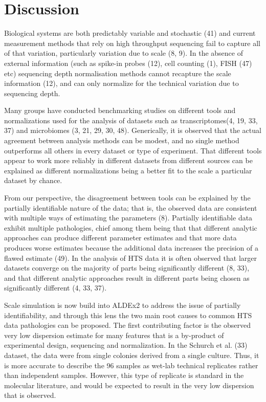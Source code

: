 \documentclass[
]{article}
\begin{document}
\section{Discussion}\label{discussion}

\doublespacing
\singlespacing

Biological systems are both predictably variable and stochastic (41) and
current measurement methods that rely on high throughput sequencing fail
to capture all of that variation, particularly variation due to scale
(8, 9). In the absence of external information (such as spike-in probes
(12), cell counting (1), FISH (47) etc) sequencing depth normalisation
methods cannot recapture the scale information (12), and can only
normalize for the technical variation due to sequencing depth.

Many groups have conducted benchmarking studies on different tools and
normalizations used for the analysis of datasets such as
transcriptomes(4, 19, 33, 37) and microbiomes (3, 21, 29, 30, 48).
Generically, it is observed that the actual agreement between analysis
methods can be modest, and no single method outperforms all others in
every dataset or type of experiment. That different tools appear to work
more reliably in different datasets from different sources can be
explained as different normalizations being a better fit to the scale a
particular dataset by chance.

From our perspective, the disagreement between tools can be explained by
the partially identifiable nature of the data; that is, the observed
data are consistent with multiple ways of estimating the parameters (8).
Partially identifiable data exhibit multiple pathologies, chief among
them being that that different analytic approaches can produce different
parameter estimates and that more data produces worse estimates because
the additional data increases the precision of a flawed estimate (49).
In the analysis of HTS data it is often observed that larger datasets
converge on the majority of parts being significantly different (8, 33),
and that different analytic approaches result in different parts being
chosen as significantly different (4, 33, 37).

Scale simulation is now build into ALDEx2 to address the issue of
partially identifiability, and through this lens the two main root
causes to common HTS data pathologies can be proposed. The first
contributing factor is the observed very low dispersion estimate for
many features that is a by-product of experimental design, sequencing
and normalization. In the Schurch et al. (33) dataset, the data were
from single colonies derived from a single culture. Thus, it is more
accurate to describe the 96 samples as wet-lab technical replicates
rather than independent samples. However, this type of replicate is
standard in the molecular literature, and would be expected to result in
the very low dispersion that is observed.
\end{document}
